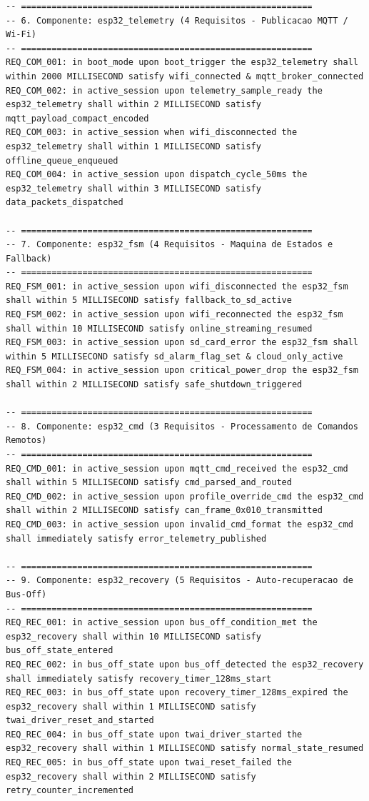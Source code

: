 \begin{lstlisting}[language=FRETish, caption={Catálogo das 48 sentenças formalizadas na gramática FRETish.}]
-- =========================================================
-- 6. Componente: esp32_telemetry (4 Requisitos - Publicacao MQTT / Wi-Fi)
-- =========================================================
REQ_COM_001: in boot_mode upon boot_trigger the esp32_telemetry shall within 2000 MILLISECOND satisfy wifi_connected & mqtt_broker_connected
REQ_COM_002: in active_session upon telemetry_sample_ready the esp32_telemetry shall within 2 MILLISECOND satisfy mqtt_payload_compact_encoded
REQ_COM_003: in active_session when wifi_disconnected the esp32_telemetry shall within 1 MILLISECOND satisfy offline_queue_enqueued
REQ_COM_004: in active_session upon dispatch_cycle_50ms the esp32_telemetry shall within 3 MILLISECOND satisfy data_packets_dispatched

-- =========================================================
-- 7. Componente: esp32_fsm (4 Requisitos - Maquina de Estados e Fallback)
-- =========================================================
REQ_FSM_001: in active_session upon wifi_disconnected the esp32_fsm shall within 5 MILLISECOND satisfy fallback_to_sd_active
REQ_FSM_002: in active_session upon wifi_reconnected the esp32_fsm shall within 10 MILLISECOND satisfy online_streaming_resumed
REQ_FSM_003: in active_session upon sd_card_error the esp32_fsm shall within 5 MILLISECOND satisfy sd_alarm_flag_set & cloud_only_active
REQ_FSM_004: in active_session upon critical_power_drop the esp32_fsm shall within 2 MILLISECOND satisfy safe_shutdown_triggered

-- =========================================================
-- 8. Componente: esp32_cmd (3 Requisitos - Processamento de Comandos Remotos)
-- =========================================================
REQ_CMD_001: in active_session upon mqtt_cmd_received the esp32_cmd shall within 5 MILLISECOND satisfy cmd_parsed_and_routed
REQ_CMD_002: in active_session upon profile_override_cmd the esp32_cmd shall within 2 MILLISECOND satisfy can_frame_0x010_transmitted
REQ_CMD_003: in active_session upon invalid_cmd_format the esp32_cmd shall immediately satisfy error_telemetry_published

-- =========================================================
-- 9. Componente: esp32_recovery (5 Requisitos - Auto-recuperacao de Bus-Off)
-- =========================================================
REQ_REC_001: in active_session upon bus_off_condition_met the esp32_recovery shall within 10 MILLISECOND satisfy bus_off_state_entered
REQ_REC_002: in bus_off_state upon bus_off_detected the esp32_recovery shall immediately satisfy recovery_timer_128ms_start
REQ_REC_003: in bus_off_state upon recovery_timer_128ms_expired the esp32_recovery shall within 1 MILLISECOND satisfy twai_driver_reset_and_started
REQ_REC_004: in bus_off_state upon twai_driver_started the esp32_recovery shall within 1 MILLISECOND satisfy normal_state_resumed
REQ_REC_005: in bus_off_state upon twai_reset_failed the esp32_recovery shall within 2 MILLISECOND satisfy retry_counter_incremented
\end{lstlisting}
